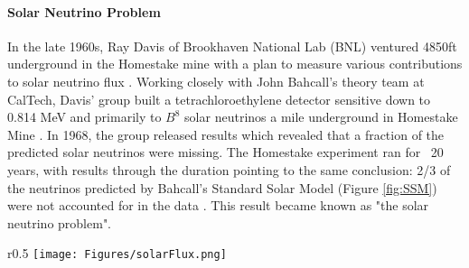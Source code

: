 \documentclass[12pt]{article}
\begin{document}
\paragraph {Solar Neutrino Problem} In the late 1960s, Ray Davis of Brookhaven National Lab (BNL) ventured 4850ft underground in the Homestake mine with a plan to measure various contributions to solar neutrino flux \cite{ray0}. Working closely with John Bahcall's theory team at CalTech, Davis' group built a tetrachloroethylene detector sensitive down to 0.814 MeV and primarily to $B^8$ solar neutrinos a mile underground in Homestake Mine \cite{ray0}. In 1968, the group released results which revealed that a fraction of the predicted solar neutrinos were missing. The Homestake experiment ran for ~20 years, with results through the duration pointing to the same conclusion: 2/3 of the neutrinos predicted by Bahcall's Standard Solar Model (Figure \ref{fig:SSM}) were not accounted for in the data \cite{ray0}. This result became known as "the solar neutrino problem".

\begin{wrapfigure}{r}{0.5\textwidth}
\texttt{[image: Figures/solarFlux.png]}
\caption{John Bahcall's Standard Solar Flux Model}
\label{fig:SSM}
\end{wrapfigure}
\end{document}
